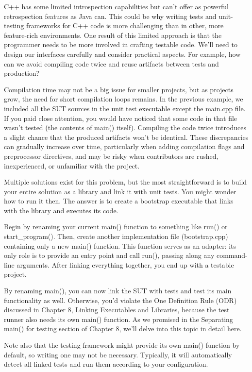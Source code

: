 C++ has some limited introspection capabilities but can’t offer as powerful retrospection features as Java can. This could be why writing tests and unit-testing frameworks for C++ code is more challenging than in other, more feature-rich environments. One result of this limited approach is that the programmer needs to be more involved in crafting testable code. We’ll need to design our interfaces carefully and consider practical aspects. For example, how can we avoid compiling code twice and reuse artifacts between tests and production?

Compilation time may not be a big issue for smaller projects, but as projects grow, the need for short compilation loops remains. In the previous example, we included all the SUT sources in the unit test executable except the main.cpp file. If you paid close attention, you would have noticed that some code in that file wasn’t tested (the contents of main() itself). Compiling the code twice introduces a slight chance that the produced artifacts won’t be identical. These discrepancies can gradually increase over time, particularly when adding compilation flags and preprocessor directives, and may be risky when contributors are rushed, inexperienced, or unfamiliar with the project.

Multiple solutions exist for this problem, but the most straightforward is to build your entire solution as a library and link it with unit tests. You might wonder how to run it then. The answer is to create a bootstrap executable that links with the library and executes its code.

Begin by renaming your current main() function to something like run() or start\_program(). Then, create another implementation file (bootstrap.cpp) containing only a new main() function. This function serves as an adapter: its only role is to provide an entry point and call run(), passing along any command-line arguments. After linking everything together, you end up with a testable project.

By renaming main(), you can now link the SUT with tests and test its main functionality as well. Otherwise, you’d violate the One Definition Rule (ODR) discussed in Chapter 8, Linking Executables and Libraries, because the test runner also needs its own main() function. As we promised in the Separating main() for testing section of Chapter 8, we’ll delve into this topic in detail here.

Note also that the testing framework might provide its own main() function by default, so writing one may not be necessary. Typically, it will automatically detect all linked tests and run them according to your configuration.

